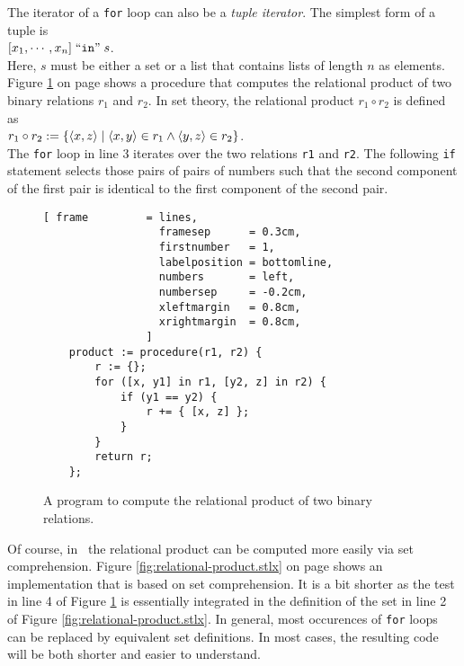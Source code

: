The iterator of a \texttt{for} loop can also be a \emph{tuple iterator}.  The simplest form of
a tuple is
\\[0.2cm]
\hspace*{1.3cm}
 $[x_1, \cdots, x_n] \;\mbox{``\texttt{in}''}\; s$.
\\[0.2cm]
Here, $s$ must be either a set or a list that contains lists of length $n$ as elements. 
Figure \ref{fig:relational-product-for.stlx} on page \pageref{fig:relational-product-for.stlx}
shows a procedure that computes the relational product 
of two binary relations $r_1$ and $r_2$.  In set theory, the relational product $r_1 \circ r_2$
is defined as
\\[0.2cm]
\hspace*{1.3cm}
$r_1 \circ r_2 := \{ \pair(x,z) \mid \pair(x,y) \in r_1 \wedge \pair(y,z) \in r_2 \}$.
\\[0.2cm]
The \texttt{for} loop in line 3 iterates over the two relations \texttt{r1} and \texttt{r2}.
The following \texttt{if} statement selects those pairs of pairs of numbers such that the second
component of the first pair is identical to the first component of the second pair.

\begin{figure}[!ht]
\centering
\begin{Verbatim}[ frame         = lines, 
                  framesep      = 0.3cm, 
                  firstnumber   = 1,
                  labelposition = bottomline,
                  numbers       = left,
                  numbersep     = -0.2cm,
                  xleftmargin   = 0.8cm,
                  xrightmargin  = 0.8cm,
                ]
    product := procedure(r1, r2) {
        r := {};
        for ([x, y1] in r1, [y2, z] in r2) {
            if (y1 == y2) {
                r += { [x, z] };
            }
        }
        return r;
    };
\end{Verbatim}
\vspace*{-0.3cm}
\caption{A program to compute the relational product of two binary relations.}
\label{fig:relational-product-for.stlx}
\end{figure}

Of course, in \setlx\ the relational product can be computed more easily via set comprehension.
Figure \ref{fig:relational-product.stlx} on page \pageref{fig:relational-product.stlx} shows
an implementation that is based on set comprehension.  It is a bit shorter as the test in
line 4 of Figure \ref{fig:relational-product-for.stlx} is essentially integrated in the
definition of the set in line 2 of Figure \ref{fig:relational-product.stlx}.
In general, most occurences of \texttt{for} loops can be replaced by equivalent set
definitions.  In most cases, the resulting code will be both shorter and easier to understand.


